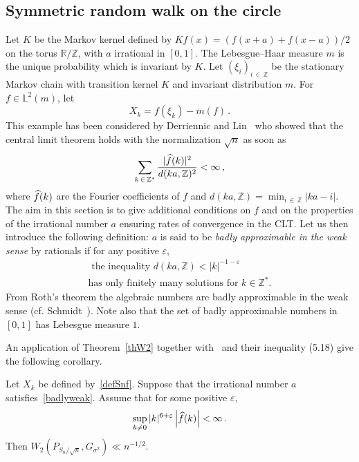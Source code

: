 \documentclass[AHL,Unicode,longabstracts,published]{cedram}
\newcommand{\bbZ}{\mathbb{Z}}
\newcommand{\bbR}{\mathbb{R}}
\newcommand{\bbL}{\mathbb{L}}
\let\oldhat\hat
\renewcommand*{\hat}[1]{\mathchoice{\widehat{#1}}{\widehat{#1}}{\oldhat{#1}}{\oldhat{#1}}}
\begin{document}
\subsection{Symmetric random walk on the circle} \label{sectcircle}

Let $K$ be the Markov kernel defined by $Kf (x) =(f (x+a) + f (x-a))/2$ on the torus $\bbR/\bbZ$, with $a$ irrational in $[0,1]$. The Lebesgue--Haar measure $m$ is the unique probability which is invariant by $K$. Let $(\xi_i)_{i\,\in\,\bbZ}$ be the stationary Markov chain with transition kernel $K$ and invariant distribution $m$. For $f \in \bbL^2(m)$, let
\begin{equation}\label{defSnf}
X_k=f(\xi_k)-m(f) \,.
\end{equation}
This example has been considered by Derriennic and Lin~\cite{DL01} who showed that the central limit theorem holds with the normalization $\sqrt{n}$ as soon as
\begin{equation}\label{Paroux}
\sum_{k\,\in\,{\bbZ}^*} \frac{|\hat f (k)|^2}{d (ka, {\bbZ})^2} < \infty
\,,
\end{equation}
where $\hat f(k)$ are the Fourier coefficients of $f$ and $d (ka, \bbZ)=\min_{i\, \in\,\bbZ} |ka-i|$. The aim in this section is to give additional conditions on $f$ and on the properties of the irrational number $a$ ensuring rates of convergence in the CLT. Let us then introduce the following definition: $a$ is said to be \emph{badly approximable in the weak sense} by rationals if for any positive $\varepsilon$,
\begin{multline}\label{badlyweak}
\text{ the inequality } d(ka, \bbZ) < |k|^{-1-\varepsilon} \\
\text{has only finitely many
solutions for }k \in \bbZ^*.
\end{multline}
From Roth's theorem the algebraic numbers are badly approximable in the weak sense (cf. Schmidt~\cite{Sc80}). Note also that the set of badly approximable numbers in $[0,1]$ has Lebesgue measure $1$.


An application of Theorem~\ref{thW2} together with~\cite[Lemma~5.2]{DR08} and their inequality (5.18) give the following corollary.



\begin{coro}\label{circle}
Let $X_k$ be defined by~\eqref{defSnf}. Suppose that the irrational number $a$ satisfies~\eqref{badlyweak}. Assume that for some positive $\varepsilon$,
\begin{equation*}\label{condirra}
\sup_{k\not= 0} |k|^{ 6 +\varepsilon} \left|\hat f (k)\right| < \infty \,.
\end{equation*}
Then $ W_2 (P_{S_n / {\sqrt n} }, G_{\sigma^2}) \ll n^{-1/2}$.
\end{coro}
\end{document}
